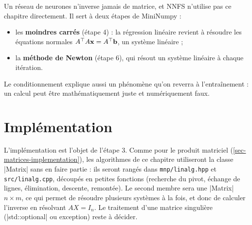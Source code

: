Un réseau de neurones n'inverse jamais de matrice, et
NNFS n'utilise pas ce chapitre directement. Il sert à
deux étapes de MiniNumpy :
\begin{itemize}
    \item les \textbf{moindres carrés} (étape 4) : la
          régression linéaire revient à résoudre les
          équations normales $A^\top A \mathbf{x} = A^\top \mathbf{b}$,
          un système linéaire ;
    \item la \textbf{méthode de Newton} (étape 6), qui
          résout un système linéaire à chaque
          itération.
\end{itemize}
Le conditionnement explique aussi un phénomène qu'on
reverra à l'entraînement : un calcul peut être
mathématiquement juste et numériquement faux.

\section{Implémentation}

\begin{codebox}
L'implémentation est l'objet de l'étape 3. Comme
pour le produit matriciel
(\cref{sec-matrices-implementation}), les
algorithmes de ce chapitre utiliseront la classe
\cpp|Matrix| sans en faire partie : ils seront
rangés dans \texttt{mnp/linalg.hpp} et
\texttt{src/linalg.cpp}, découpés en petites fonctions
(recherche du pivot, échange de lignes, élimination,
descente, remontée). Le second membre sera une
\cpp|Matrix| $n \times m$, ce qui permet de résoudre
plusieurs systèmes à la fois, et donc de calculer
l'inverse en résolvant $AX = I_n$. Le traitement d'une
matrice singulière (\cpp|std::optional| ou
exception) reste à décider.
\end{codebox}

\newpage
